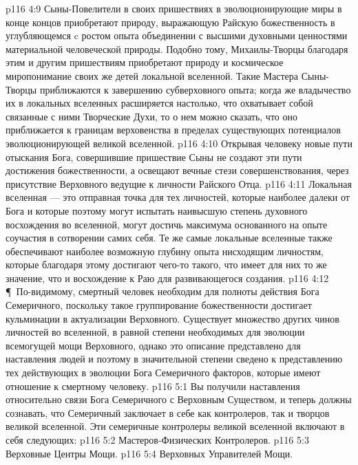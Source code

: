 \vs p116 4:9 Сыны\hyp{}Повелители в своих пришествиях в эволюционирующие миры в конце концов приобретают природу, выражающую Райскую божественность в углубляющемся c ростом опыта объединении с высшими духовными ценностями материальной человеческой природы. Подобно тому, Михаилы\hyp{}Творцы благодаря этим и другим пришествиям приобретают природу и космическое миропонимание своих же детей локальной вселенной. Такие Мастера Сыны\hyp{}Творцы приближаются к завершению субверховного опыта; когда же владычество их в локальных вселенных расширяется настолько, что охватывает собой связанные с ними Творческие Духи, то о нем можно сказать, что оно приближается к границам верховенства в пределах существующих потенциалов эволюционирующей великой вселенной.
\vs p116 4:10 Открывая человеку новые пути отыскания Бога, совершившие пришествие Сыны не создают эти пути достижения божественности, а освещают вечные стези совершенствования, через присутствие Верховного ведущие к личности Райского Отца.
\vs p116 4:11 Локальная вселенная --- это отправная точка для тех личностей, которые наиболее далеки от Бога и которые поэтому могут испытать наивысшую степень духовного восхождения во вселенной, могут достичь максимума основанного на опыте соучастия в сотворении самих себя. Те же самые локальные вселенные также обеспечивают наиболее возможную глубину опыта нисходящим личностям, которые благодаря этому достигают чего\hyp{}то такого, что имеет для них то же значение, что и восхождение к Раю для развивающегося создания.
\vs p116 4:12 \P\ По\hyp{}видимому, смертный человек необходим для полноты действия Бога Семеричного, поскольку такое группирование божественности достигает кульминации в актуализации Верховного. Существует множество других чинов личностей во вселенной, в равной степени необходимых для эволюции всемогущей мощи Верховного, однако это описание представлено для наставления людей и поэтому в значительной степени сведено к представлению тех действующих в эволюции Бога Семеричного факторов, которые имеют отношение к смертному человеку.
\vs p116 5:1 Вы получили наставления относительно связи Бога Семеричного с Верховным Существом, и теперь должны сознавать, что Семеричный заключает в себе как контролеров, так и творцов великой вселенной. Эти семеричные контролеры великой вселенной включают в себя следующих:
\vs p116 5:2 \bibnobreakspace Мастеров\hyp{}Физических Контролеров.
\vs p116 5:3 \bibnobreakspace Верховные Центры Мощи.
\vs p116 5:4 \bibnobreakspace Верховных Управителей Мощи.
